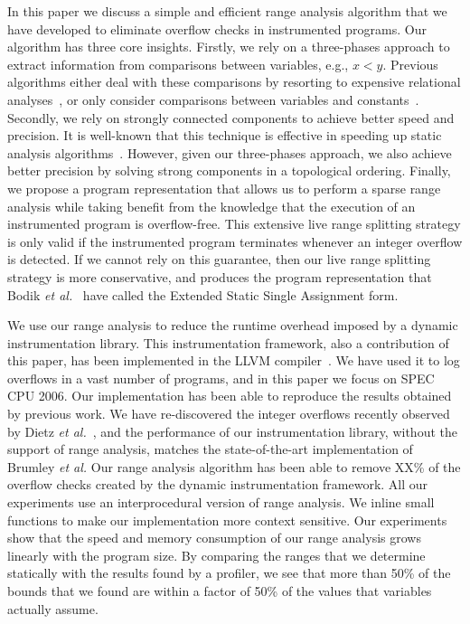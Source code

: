 \documentclass[preprint]{sigplanconf}[10pt]
\begin{document}
In this paper we discuss a simple and efficient range analysis algorithm that
we have developed to eliminate overflow checks in instrumented programs.
Our algorithm has three core insights.
Firstly, we rely on a three-phases approach to extract information from
comparisons between variables, e.g., $x < y$.
Previous algorithms either deal with these comparisons by resorting to
expensive relational analyses~\cite{Cousot78,Lakhdar11,Mine06}, or only
consider comparisons between variables and
constants~\cite{Mahlke01,Patterson95,Stephenson00}.
Secondly, we rely on strongly connected components to achieve better speed and
precision.
It is well-known that this technique is effective in speeding up static analysis
algorithms~\cite[Sec 6.3]{Nielson99}.
However, given our three-phases approach, we also achieve better precision
by solving strong components in a topological ordering.
Finally, we propose a program representation that allows us to perform a sparse
range analysis while taking benefit from the knowledge that the execution of
an instrumented program is overflow-free.
This extensive live range splitting strategy is only valid if the instrumented
program terminates whenever an integer overflow is detected.
If we cannot rely on this guarantee, then our live range splitting strategy
is more conservative, and produces the program representation that Bodik
{\em et al.}~\cite{Bodik00} have called the Extended Static Single Assignment
form.

We use our range analysis to reduce the runtime overhead imposed by a dynamic
instrumentation library.
This instrumentation framework, also a contribution of this paper, has been
implemented in the LLVM compiler~\cite{Lattner04}.
We have used it to log overflows in a vast number of programs, and in this
paper we focus on SPEC CPU 2006.
Our implementation has been able to reproduce the results obtained by
previous work.
We have re-discovered the integer overflows recently observed by
Dietz {\em et al.}~\cite{Dietz12}, and the performance of our instrumentation
library, without the support of range analysis, matches the state-of-the-art
implementation of Brumley {\em et al.}
Our range analysis algorithm has been able to remove XX\% of the overflow
checks created by the dynamic instrumentation framework.
All our experiments use an interprocedural version of range analysis.
We inline small functions to make our implementation more context sensitive.
Our experiments show that the speed and memory consumption of our range
analysis grows linearly with the program size.
By comparing the ranges that we determine statically with the results found by
a profiler, we see that more than 50\% of the bounds that we found are within a
factor of 50\% of the values that variables actually assume.
\end{document}
